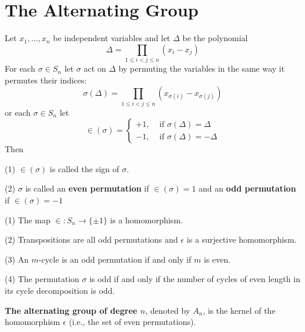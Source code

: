 \section{The Alternating Group}
\begin{definition}
    Let $x_1, \ldots, x_n$ be independent variables and let $\Delta$ be the polynomial
    \[
        \Delta=\prod_{1 \leq i<j \leq n}\left(x_i-x_j\right)
    \]
    For each $\sigma \in S_n$ let $\sigma$ act on $\Delta$ by permuting the variables in the same way it permutes their indices:
    \[
        \sigma(\Delta)=\prod_{1 \leq i<j \leq n}\left(x_{\sigma(i)}-x_{\sigma(j)}\right)
    \]
    or each $\sigma \in S_n$ let
    \[
        \in(\sigma)= \begin{cases}+1, & \text { if } \sigma(\Delta)=\Delta \\ -1, & \text { if } \sigma(\Delta)=-\Delta\end{cases}
    \]
    Then

    (1) $\in(\sigma)$ is called the sign of $\sigma$.

    (2) $\sigma$ is called an \textbf{even permutation} if $\in(\sigma)=1$ and an \textbf{odd permutation} if $\in(\sigma)=-1$
\end{definition}

\begin{proposition}
    (1) The map $\in: S_n \rightarrow\{ \pm 1\}$ is a homomorphism.

    (2) Transpositions are all odd permutations and $\epsilon$ is a surjective homomorphism.

    (3) An $m$-cycle is an odd permutation if and only if $m$ is even.

    (4) The permutation $\sigma$ is odd if and only if the number of cycles of even length in its cycle decomposition is odd.
\end{proposition}



\begin{definition}
    \textbf{The alternating group of degree $n$}, denoted by $A_n$, is the kernel of the homomorphism $\epsilon$ (i.e., the set of even permutations).
\end{definition}




